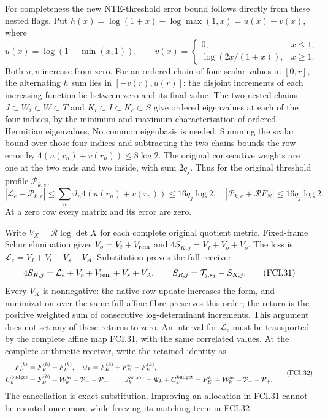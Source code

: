 For completeness the new NTE-threshold error bound follows directly from these
nested flags.  Put $h(x)=\log(1+x)-\log\max(1,x)=u(x)-v(x)$,
where
\[
 u(x)=\log(1+\min(x,1)),\qquad
 v(x)=\begin{cases}0,&x\leq1,\\\log(2x/(1+x)),&x\geq1.\end{cases}
\]
Both $u,v$ increase from zero.  For an ordered chain of four scalar
values in $[0,r]$, the alternating $h$ sum lies in $[-v(r),u(r)]$:
the disjoint increments of each increasing function lie between zero
and its final value.  The two nested chains
$J\subset W_i\subset W\subset T$ and $K_i\subset I\subset K_c\subset S$
give ordered eigenvalues at each of the four indices, by the minimum
and maximum characterization of ordered Hermitian eigenvalues.
No common eigenbasis is needed.  Summing the scalar bound over those
four indices and subtracting the two chains bounds the row error by
$4(u(r_n)+v(r_n))\leq8\log2$.
The original consecutive weights are one at the two ends and two
inside, with sum $2q_j$.  Thus for the original threshold profile
$\mathcal P_{k,e}$,
\[
 |\mathcal L_e-\mathcal P_{k,e}|
 \leq\sum_n\vartheta_n4(u(r_n)+v(r_n))\leq16q_j\log2,
 \quad |\mathcal P_{k,e}+\mathcal RF_N|\leq16q_j\log2.
 \tag{FCI.30}
\]
At a zero row every matrix and its error are zero.

Write $V_X=\mathcal R\log\det X$ for each complete original
quotient metric.  Fixed-frame Schur elimination gives
$V_o=V_t+V_{\rm rem}$ and
$4S_{K,j}=V_I+V_b+V_o$.  The loss is
$\mathcal L_e=V_I+V_t-V_s-V_A$.  Substitution proves the full receiver
\[
 4S_{K,j}=\mathcal L_e+V_b+V_{\rm rem}+V_s+V_A,
 \qquad S_{R,j}=\mathcal T_{j,s_1}-S_{K,j}.
 \tag{FCI.31}
\]
Every $V_X$ is nonnegative: the native row update increases the form,
and minimization over the same full affine fibre preserves this
order; the return is the positive weighted sum of consecutive
log-determinant increments.  This argument does not set any of these
returns to zero.  An interval for $\mathcal L_e$ must be transported
by the complete affine map FCI.31, with the same correlated values.
At the complete arithmetic receiver, write the retained identity as
\[
 \begin{split}
 F_E^{(k)}&=F_K^{(k)}+F_B^{(k)},\quad
 \Psi_k=F_K^{(k)}+F_E^{\rm ar}-F_E^{(k)},\\
 C_k^{\rm budget}&=F_B^{(k)}+\mathcal W_k^{\rm ar}-\mathcal P_--\mathcal P_+,\qquad
 J_k^{\rm action}=\Psi_k+C_k^{\rm budget}
  =F_E^{\rm ar}+\mathcal W_k^{\rm ar}-\mathcal P_--\mathcal P_+.
 \end{split}\tag{FCI.32}
\]
The cancellation is exact substitution.  Improving an allocation in
FCI.31 cannot be counted once more while freezing its matching
term in FCI.32.

